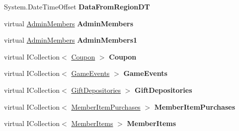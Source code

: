 \begin{DoxyCompactItemize}
\item 
System.\+Date\+Time\+Offset {\bfseries Data\+From\+Region\+DT}\hypertarget{a00127_adb6a4c61192a9fa2d56b377b13b5b75d}{}\label{a00127_adb6a4c61192a9fa2d56b377b13b5b75d}

\item 
virtual \hyperlink{a00012}{Admin\+Members} {\bfseries Admin\+Members}\hypertarget{a00127_aa6377badc9367f2094e700f103328611}{}\label{a00127_aa6377badc9367f2094e700f103328611}

\item 
virtual \hyperlink{a00012}{Admin\+Members} {\bfseries Admin\+Members1}\hypertarget{a00127_ae9030e8da31cd7a16a2721251bc8e836}{}\label{a00127_ae9030e8da31cd7a16a2721251bc8e836}

\item 
virtual I\+Collection$<$ \hyperlink{a00068}{Coupon} $>$ {\bfseries Coupon}\hypertarget{a00127_af8ba79ffaadf61da3402bdd499c64fa0}{}\label{a00127_af8ba79ffaadf61da3402bdd499c64fa0}

\item 
virtual I\+Collection$<$ \hyperlink{a00083}{Game\+Events} $>$ {\bfseries Game\+Events}\hypertarget{a00127_a1ec0237c736e39bf2a7d2ea5bd470920}{}\label{a00127_a1ec0237c736e39bf2a7d2ea5bd470920}

\item 
virtual I\+Collection$<$ \hyperlink{a00086}{Gift\+Depositories} $>$ {\bfseries Gift\+Depositories}\hypertarget{a00127_a23669e587994795418fbac93ebee2a7c}{}\label{a00127_a23669e587994795418fbac93ebee2a7c}

\item 
virtual I\+Collection$<$ \hyperlink{a00141}{Member\+Item\+Purchases} $>$ {\bfseries Member\+Item\+Purchases}\hypertarget{a00127_acf8e0f96489d1a7c4056e291571c24e6}{}\label{a00127_acf8e0f96489d1a7c4056e291571c24e6}

\item 
virtual I\+Collection$<$ \hyperlink{a00143}{Member\+Items} $>$ {\bfseries Member\+Items}\hypertarget{a00127_aa553923398f5f7d8fd9bca95c5dd2ba5}{}\label{a00127_aa553923398f5f7d8fd9bca95c5dd2ba5}

\end{DoxyCompactItemize}


